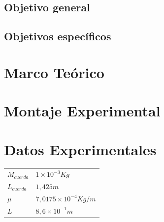 \documentclass[twocolumn, 12pt]{article}
\begin{document}
\subsection{Objetivo general}


\subsection{Objetivos específicos}



\section{Marco Teórico}

\section{Montaje Experimental}

\section{Datos Experimentales}

\begin{table}[H]
    \begin{center}
        \begin{tabularx}{0.9\linewidth}{|>{\centering\arraybackslash}X|>{\centering\arraybackslash}X|}
            \hline
            \multicolumn{2}{|c|}{\textbf{Constantes}}            \\\hline
            $M_{cuerda}$ & $1 \times 10^{-3} Kg$        \\\hline
            $L_{cuerda}$ & $1,425 m$                    \\\hline
            $\mu$        & $7,0175 \times 10^{-4} Kg/m$ \\\hline
            $L$          & $8,6 \times 10^{-1} m$       \\\hline
        \end{tabularx}
    \end{center}
\end{table}
\end{document}
